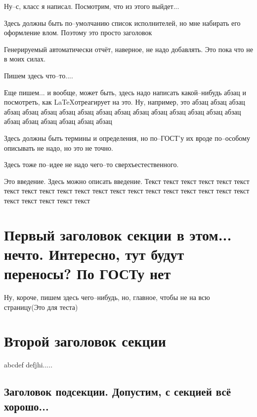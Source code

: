 \documentclass{article}
\begin{document}
{\Huge
Ну--с, класс я написал. Посмотрим, что из этого выйдет...

}


\Executors

Здесь должны быть по--умолчанию список исполнителей, но мне набирать его оформление влом. Поэтому это просто заголовок

\Repherat

Генерируемый автоматически отчёт, наверное, не надо добавлять. Это пока что не в моих силах.

Пишем здесь что--то....

Еще пишем... и вообще, может быть, здесь надо написать какой--нибудь абзац и посмотреть, как \LaTeX отреагирует на это. Ну, например, это абзац  абзац абзац абзац абзац абзац абзац абзац абзац абзац абзац абзац абзац абзац абзац абзац абзац абзац абзац абзац абзац абзац

\newpage
\tableofcontents

\TermAndDefine

Здесь должны быть термины и определения, но по--ГОСТ'у их вроде по--особому описывать не надо, но это не точно.

\listAbbreviationAndNotation

Здесь тоже по--идее не надо чего--то сверхъестественного.

\Intoduction

Это введение. Здесь можно описать введение. Текст текст текст текст текст текст текст текст текст текст текст текст текст текст текст текст текст текст текст текст текст текст текст текст текст

\section{Первый заголовок секции в этом... нечто. Интересно, тут будут переносы? По ГОСТу нет}

Ну, короче, пишем здесь чего--нибудь, но, главное, чтобы не на всю страницу(Это для теста)

\section{Второй заголовок секции}

abcdef defjhi.....

\subsection{Заголовок подсекции. Допустим, с секцией всё хорошо...}
\end{document}
